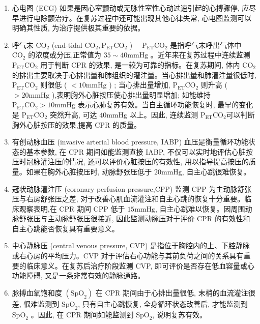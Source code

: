 \documentclass[10pt]{article}
\begin{document}
\begin{enumerate}
  \item 心电图 (ECG) 如果是因心室颤动或无脉性室性心动过速引起的心搏骤停, 应尽早进行电除颤治疗。在复苏过程中还可能出现其他心律失常, 心电图监测可以明确其性质, 为治疗提供极其重要的依据。

  \item 呼气末 $\mathrm{CO}_{2}$ (end-tidal $\mathrm{CO}_{2}, \mathrm{P}_{\mathrm{ET}} \mathrm{CO}_{2}$ ) $\quad \mathrm{P}_{\mathrm{ET}} \mathrm{CO}_{2}$ 是指呼气末呼出气体中 $\mathrm{CO}_{2}$ 的浓度或分压,正常值为 $35 \sim 40 \mathrm{mmHg}$ 。近年来在复苏过程中连续监测 $\mathrm{P}_{\mathrm{ET}} \mathrm{CO}_{2}$ 用于判断 CPR 的效果, 是一较为可靠的指标。在复苏期间, 体内 $\mathrm{CO}_{2}$ 的排出主要取决于心排出量和肺组织的灌注量。当心排出量和肺灌注量很低时, $\mathrm{P}_{\mathrm{ET}} \mathrm{CO}_{2}$ 则很低 ( $<10 \mathrm{mmHg}$ ) ; 当心排出量增加, $\mathrm{P}_{\mathrm{ET}} \mathrm{CO}_{2}$ 则升高 ( $>20 \mathrm{mmHg}$ ),表明胸外心脏按压使心排出量明显增加; 如能维持 $\mathrm{P}_{\mathrm{ET}} \mathrm{CO}_{2}>10 \mathrm{mmHg}$ 表示心肺复苏有效。当自主循环功能恢复时, 最早的变化是 $\mathrm{P}_{\mathrm{ET}} \mathrm{CO}_{2}$ 突然升高, 可达 $40 \mathrm{mmHg}$ 以上。因此, 连续监测 $\mathrm{P}_{\mathrm{ET}} \mathrm{CO}_{2}$可以判断胸外心脏按压的效果,提高 CPR 的质量。

  \item 有创动脉血压 (invasive arterial blood pressure, IABP) 血压是衡量循环功能状态的基本参数, 在 CPR 期间如能监测直接 IABP, 不仅可以实时地评估心脏按压时冠脉灌注压的情况, 还可以评价心脏按压的有效性, 用以指导提高按压的质量。如果在胸外心脏按压时, 动脉舒张压低于 $20 \mathrm{mmHg}$, 自主心跳很难恢复。

  \item 冠状动脉灌注压 (coronary perfusion pressure,CPP) 监测 CPP 为主动脉舒张压与右房舒张压之差, 对于改善心肌血流灌注和自主心跳的恢复十分重要。临床观察表明,在 CPR 期间 CPP 低于 $15 \mathrm{mmHg}$, 自主心跳难以恢复。因周围动脉舒张压与主动脉舒张压很接近, 因此监测动脉压对于评价 CPR 的有效性和自主心跳能否恢复具有重要意义。

  \item 中心静脉压 (central venous pressure, CVP) 是指位于胸腔内的上、下腔静脉或右心房的平均压力。CVP 对于评估右心功能与其前负荷之间的关系具有重要的临床意义。在复苏后治疗阶段监测 CVP, 即可评价是否存在低血容量或心功能障碍, 又是一条非常有效的静脉通路。

  \item 脉搏血氧饱和度 $\left(\mathrm{SpO}_{2}\right)$ 在 $\mathrm{CPR}$ 期间由于心排出量很低, 末梢的血流灌注很差, 很难监测到 $\mathrm{SpO}_{2}$, 只有自主心跳恢复, 全身循环状态改善后, 才能监测到 $\mathrm{SpO}_{2}$ 。因此, 在 $\mathrm{CPR}$ 期间如能监测到 $\mathrm{SpO}_{2}$, 说明复苏有效。


\end{enumerate}
\end{document}
